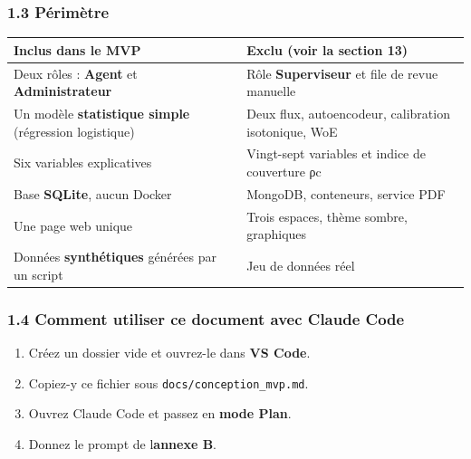 \documentclass[
  french,
  11pt,
  a4paper,
]{article}
\providecommand{\tightlist}{%
  \setlength{\itemsep}{0pt}\setlength{\parskip}{0pt}}
\begin{document}
\subsubsection{1.3 Périmètre}\label{13-puxe9rimuxe8tre}

\begin{longtable}[]{@{}
  >{\raggedright\arraybackslash}p{}
  >{\raggedright\arraybackslash}p{}@{}}
\toprule\noalign{}
\begin{minipage}[b]{\linewidth}\raggedright
Inclus dans le MVP
\end{minipage} & \begin{minipage}[b]{\linewidth}\raggedright
Exclu (voir la section 13)
\end{minipage} \\
\midrule\noalign{}
\endhead
\bottomrule\noalign{}
\endlastfoot
Deux rôles : \textbf{Agent} et \textbf{Administrateur} & Rôle
\textbf{Superviseur} et file de revue manuelle \\
Un modèle \textbf{statistique simple} (régression logistique) & Deux
flux, autoencodeur, calibration isotonique, WoE \\
Six variables explicatives & Vingt-sept variables et indice de
couverture ρc \\
Base \textbf{SQLite}, aucun Docker & MongoDB, conteneurs, service PDF \\
Une page web unique & Trois espaces, thème sombre, graphiques \\
Données \textbf{synthétiques} générées par un script & Jeu de données
réel \\
\end{longtable}

\subsubsection{1.4 Comment utiliser ce document avec Claude
Code}\label{14-comment-utiliser-ce-document-avec-claude-code}

\begin{enumerate}
\def\labelenumi{\arabic{enumi}.}
\tightlist
\item
  Créez un dossier vide et ouvrez-le dans \textbf{VS Code}.
\item
  Copiez-y ce fichier sous
  \texttt{docs/\allowbreak{}conception\_\allowbreak{}mvp.\allowbreak{}md}.
\item
  Ouvrez Claude Code et passez en \textbf{mode Plan}.
\item
  Donnez le prompt de l\textquotesingle{}\textbf{annexe B}.
\end{enumerate}
\end{document}
